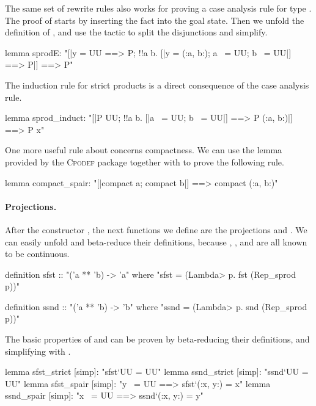 The same set of rewrite rules also works for proving a case analysis rule for type . The proof of  starts by inserting the fact  into the goal state. Then we unfold the definition of , and use the  tactic to split the disjunctions and simplify.
%
\begin{isacode}
lemma sprodE:
  "[|y = UU ==> P; !!a b. [|y = (:a, b:); a ~= UU; b ~= UU|] ==> P|] ==> P"
\end{isacode}
%
The induction rule for strict products is a direct consequence of the case analysis rule.
%
\begin{isacode}
lemma sprod_induct: "[|P UU; !!a b. [|a ~= UU; b ~= UU|] ==> P (:a, b:)|] ==> P x"
\end{isacode}

One more useful rule about  concerns compactness. We can use the lemma  provided by the \textsc{Cpodef} package together with  to prove the following rule.
%
\begin{isacode}
lemma compact_spair: "[|compact a; compact b|] ==> compact (:a, b:)"
\end{isacode}
\unmedskip

\paragraph{Projections.} After the constructor , the next functions we define are the projections  and . We can easily unfold and beta-reduce their definitions, because , , and  are all known to be continuous.
\begin{isacode}
definition sfst :: "('a ** 'b) -> 'a"
  where "sfst = (\<Lambda> p. fst (Rep_sprod p))"
\end{isacode}
\unmedskip
{}
\begin{isacode}
definition ssnd :: "('a ** 'b) -> 'b"
  where "ssnd = (\<Lambda> p. snd (Rep_sprod p))"
\end{isacode}
The basic properties of  and  can be proven by beta-reducing their definitions, and simplifying with .
\begin{isacodes}
lemma sfst_strict [simp]: "sfst`UU = UU"
lemma ssnd_strict [simp]: "ssnd`UU = UU"
lemma sfst_spair [simp]: "y ~= UU ==> sfst`(:x, y:) = x"
lemma ssnd_spair [simp]: "x ~= UU ==> ssnd`(:x, y:) = y"
\end{isacodes}
\unmedskip

